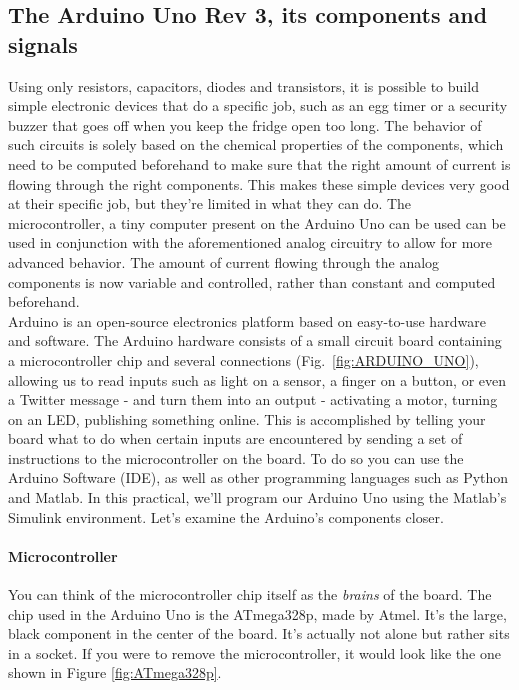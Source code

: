 \documentclass[10pt,twoside,openright]{article}
\begin{document}

\subsection{The Arduino Uno Rev 3, its components and signals}

Using only resistors, capacitors, diodes and transistors, it is possible to build simple electronic devices that do a specific job, such as an egg timer or a security buzzer that goes off when you keep the fridge open too long. The behavior of such circuits is solely based on the chemical properties of the components, which need to be computed beforehand to make sure that the right amount of current is flowing through the right components. This makes these simple devices very good at their specific job, but they're limited in what they can do. The microcontroller, a tiny computer present on the Arduino Uno can be used can be used in conjunction with the aforementioned analog circuitry to allow for more advanced behavior. The amount of current flowing through the analog components is now variable and controlled, rather than constant and computed beforehand.\\

Arduino is an open-source electronics platform based on easy-to-use hardware and software. The Arduino hardware consists of a small circuit board containing a microcontroller chip and several connections (Fig.~\ref{fig:ARDUINO_UNO}), allowing us to read inputs such as light on a sensor, a finger on a button, or even a Twitter message - and turn them into an output - activating a motor, turning on an LED, publishing something online. This is accomplished by telling your board what to do when certain inputs are encountered by sending a set of instructions to the microcontroller on the board. To do so you can use the Arduino Software (IDE), as well as other programming languages such as Python and Matlab. In this practical, we'll program our Arduino Uno using the Matlab's Simulink environment. Let's examine the Arduino's components closer.

\paragraph{Microcontroller} You can think of the microcontroller chip itself as the \textit{brains} of the board. The chip used in the Arduino Uno is the ATmega328p, made by Atmel. It’s the large, black component in the center of the board. It’s actually not alone but rather sits in a socket. If you were to remove the microcontroller, it would look like the one shown in Figure \ref{fig:ATmega328p}.
\end{document}
